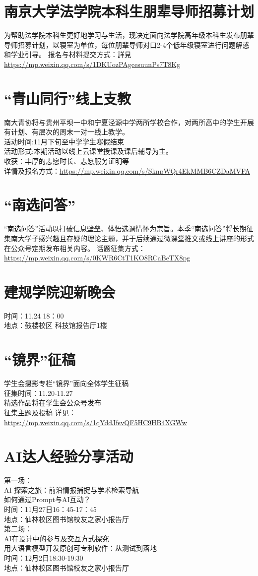\documentclass[letterpaper, 12pt]{article}
\begin{document}
\begin{multicols}{2}
\section{南京大学法学院本科生朋辈导师招募计划}
为帮助法学院本科生更好地学习与生活，现决定面向法学院高年级本科生发布朋辈导师招募计划，以寝室为单位，每位朋辈导师对口2-4个低年级寝室进行问题解惑和学业引导。
报名与材料提交方式：詳見\url{https://mp.weixin.qq.com/s/1DKUozPAgcesuunPs7T8Kg}
\section{“青山同行”线上支教}
南大青协将与贵州平坝一中和宁夏泾源中学两所学校合作，对两所高中的学生开展有计划、有层次的周末一对一线上教学。\\
活动时间:11月下旬至中学学生寒假结束\\
活动形式:本期活动以线上云课堂授课及课后辅导为主。\\
收获：丰厚的志愿时长、志愿服务证明等\\
详情及报名方式：\url{https://mp.weixin.qq.com/s/SknpWQr4EkMMB6CZDaMVFA}\\
\section{“南选问答”}
“南选问答”活动以打破信息壁垒、体悟选调情怀为宗旨。本季“南选问答”将长期征集南大学子感兴趣且存疑的理论主题，并于后续通过微课堂推文或线上讲座的形式在公众号定期发布相关内容。
话题征集方式：\url{https://mp.weixin.qq.com/s/0KWR6CtT1KO8RCaBeTX8pg}\\
\section{建规学院迎新晚会}
时间：11.24 18：00\\
地点：鼓楼校区 科技馆报告厅1楼\\
\section{“镜界”征稿}
学生会摄影专栏“镜界”面向全体学生征稿\\
征集时间：11.20-11.27\\
精选作品将在学生会公众号发布\\
征集主题及投稿 详见：\url{https://mp.weixin.qq.com/s/1qYddJfsvQF5HC9HB4XGWw}
\section{AI达人经验分享活动}
第一场：\\
AI 探索之旅：前沿情报捕捉与学术检索导航\\
如何通过Prompt与AI互动？\\
时间：11月27日16：45-17：45\\
地点：仙林校区图书馆校友之家小报告厅\\
第二场：\\
AI在设计中的参与及交互方式探究\\
用大语言模型开发原创可专利软件：从测试到落地\\
时间：12月2日18:30-19:30\\
地点：仙林校区图书馆校友之家小报告厅\\

\end{multicols}
\end{document}
